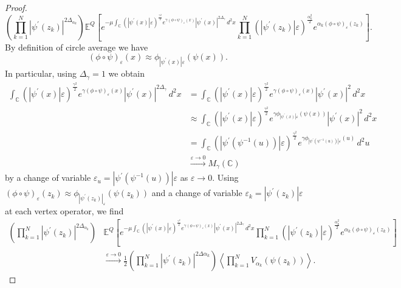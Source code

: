 \documentclass[reqno]{amsart}
\newcommand{\idd}[4]{\int_{#1}^{#2}#3\,d^2#4}
\newcommand{\p}{\prime}
\renewcommand{\l}{\left}
\renewcommand{\r}{\right}
\newcommand{\la}{\langle}
\newcommand{\ra}{\rangle}
\newcommand{\C}{\mathbb{C}}
\newcommand{\E}{\mathbb{E}}
\renewcommand{\a}{\alpha}
\renewcommand{\epsilon}{\varepsilon}
\newcommand{\e}{\epsilon}
\theoremstyle{definition}
\begin{document}
\begin{proof}
\[\l(\prod_{k=1}^N|\psi^\p(z_k)|^{2\Delta_{\a_k}}\r)\E^Q\l[e^{-\mu\idd{\C}{}{(|\psi^\p(x)|\e)^{\frac{\gamma^2}{2}}e^{\gamma(\phi\circ\psi)_\e(x)}|\psi^\p(x)|^{2\Delta_\gamma}}{x}}\prod_{k=1}^N(|\psi^\p(z_k)|\e)^{\frac{\a_k^2}{2}}e^{\a_k(\phi\circ\psi)_\e(z_k)}\r].\]
\endgroup
By definition of circle average we have
\[(\phi\circ\psi)_\e(x)\approx\phi_{|\psi^\p(x)|\e}(\psi(x)).\]
In particular, using $\Delta_\gamma=1$ we obtain
\begin{align*}
\idd{\C}{}{(|\psi^\p(x)|\e)^{\frac{\gamma^2}{2}}e^{\gamma(\phi\circ\psi)_\e(x)}|\psi^\p(x)|^{2\Delta_\gamma}}{x}
&=\idd{\C}{}{(|\psi^\p(x)|\e)^{\frac{\gamma^2}{2}}e^{\gamma(\phi\circ\psi)_\e(x)}|\psi^\p(x)|^2}{x}\\
&\approx\idd{\C}{}{(|\psi^\p(x)|\e)^{\frac{\gamma^2}{2}}e^{\gamma\phi_{|\psi^\p(x)|\e}(\psi(x))}|\psi^\p(x)|^2}{x}\\
&=\idd{\C}{}{(|\psi^\p(\psi^{-1}(u))|\e)^{\frac{\gamma^2}{2}}e^{\gamma\phi_{|\psi^\p(\psi^{-1}(u))|\e}(u)}}{u}\\
&\stackrel{\e\to0}{\to}M_\gamma(\C)
\end{align*}
by a change of variable $\e_u=|\psi^\p(\psi^{-1}(u))|\e$ as $\e\to0$. Using $(\phi\circ\psi)_\e(z_k)\approx\phi_{|\psi^\p(z_k)|_\e}(\psi(z_k))$ and a change of variable $\e_k=|\psi^\p(z_k)|\e$ at each vertex operator, we find
\begingroup\makeatletter\def\f@size{9.5}\check@mathfonts
\begin{align*}
\l(\prod_{k=1}^N|\psi^\p(z_k)|^{2\Delta_{\a_k}}\r)&\E^Q\l[e^{-\mu\idd{\C}{}{(|\psi^\p(x)|\e)^{\frac{\gamma^2}{2}}e^{\gamma(\phi\circ\psi)_\e(x)}|\psi^\p(x)|^{2\Delta_\gamma}}{x}}\prod_{k=1}^N(|\psi^\p(z_k)|\e)^{\frac{\a_k^2}{2}}e^{\a_k(\phi\circ\psi)_\e(z_k)}\r]\\
&\stackrel{\e\to0}{\to}\frac{1}{2}\l(\prod_{k=1}^N|\psi^\p(z_k)|^{2\Delta\a_k}\r)\l\la\prod_{k=1}^NV_{\a_k}(\psi(z_k))\r\ra.
\end{align*}
\endgroup
\end{proof}
\end{document}
